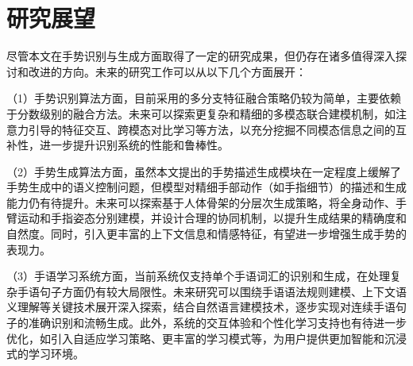 \section{研究展望}
尽管本文在手势识别与生成方面取得了一定的研究成果，但仍存在诸多值得深入探讨和改进的方向。未来的研究工作可以从以下几个方面展开：

（1）手势识别算法方面，目前采用的多分支特征融合策略仍较为简单，主要依赖于分数级别的融合方法。未来可以探索更复杂和精细的多模态联合建模机制，如注意力引导的特征交互、跨模态对比学习等方法，以充分挖掘不同模态信息之间的互补性，进一步提升识别系统的性能和鲁棒性。

（2）手势生成算法方面，虽然本文提出的手势描述生成模块在一定程度上缓解了手势生成中的语义控制问题，但模型对精细手部动作（如手指细节）的描述和生成能力仍有待提升。未来可以探索基于人体骨架的分层次生成策略，将全身动作、手臂运动和手指姿态分别建模，并设计合理的协同机制，以提升生成结果的精确度和自然度。同时，引入更丰富的上下文信息和情感特征，有望进一步增强生成手势的表现力。

（3）手语学习系统方面，当前系统仅支持单个手语词汇的识别和生成，在处理复杂手语句子方面仍有较大局限性。未来研究可以围绕手语语法规则建模、上下文语义理解等关键技术展开深入探索，结合自然语言建模技术，逐步实现对连续手语句子的准确识别和流畅生成。此外，系统的交互体验和个性化学习支持也有待进一步优化，如引入自适应学习策略、更丰富的学习模式等，为用户提供更加智能和沉浸式的学习环境。
